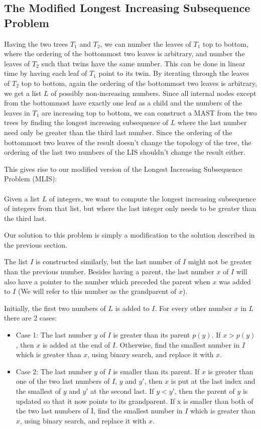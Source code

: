 \subsection{The Modified Longest Increasing Subsequence Problem}
\label{mlisSection}
Having the two trees $T_1$ and $T_2$, we can number the leaves of $T_1$ top to bottom, where the ordering of the bottommost two leaves is arbitrary, and number the leaves of $T_2$ such that twins have the same number. This can be done in linear time by having each leaf of $T_1$ point to its twin. By iterating through the leaves of $T_2$ top to bottom, again the ordering of the bottommost two leaves is arbitrary, we get a list $L$ of possibly non-increasing numbers. Since all internal nodes except from the bottommost have exactly one leaf as a child and the numbers of the leaves in $T_1$ are increasing top to bottom, we can construct a MAST from the two trees by finding the longest increasing subsequence of $L$ where the last number need only be greater than the third last number. Since the ordering of the bottommost two leaves of the result doesn't change the topology of the tree, the ordering of the last two numbers of the LIS shouldn't change the result either.

This gives rise to our modified version of the Longest Increasing Subsequence Problem (MLIS):\\
\\
Given a list $L$ of integers, we want to compute the longest increasing subsequence of integers from that list, but where the last integer only needs to be greater than the third last.

Our solution to this problem is simply a modification to the solution described in the previous section.

The list $I$ is constructed similarly, but the last number of $I$ might not be greater than the previous number. Besides having a parent, the last number $x$ of $I$ will also have a pointer to the number which preceded the parent when $x$ was added to $I$ (We will refer to this number as the grandparent of $x$).

Initially, the first two numbers of $L$ is added to $I$. For every other number $x$ in $L$ there are 2 cases:

\begin{itemize}
	\item Case 1: The last number $y$ of $I$ is greater than its parent $p(y)$.
	\subitem If $x > p(y)$, then $x$ is added at the end of $I$.
	\subitem Otherwise, find the smallest number in $I$ which is greater than $x$, using binary search, and replace it with $x$.
	\item Case 2: The last number $y$ of $I$ is smaller than its parent.
	\subitem If $x$ is greater than one of the two last numbers of $I$, $y$ and $y'$, then $x$ is put at the last index and the smallest of $y$ and $y'$ at the second last.
	\subsubitem If $y < y'$, then the parent of $y$ is updated so that it now points to its grandparent.
	\subitem If x is smaller than both of the two last numbers of I, find the smallest number in $I$ which is greater than $x$, using binary search, and replace it with $x$.
\end{itemize}

